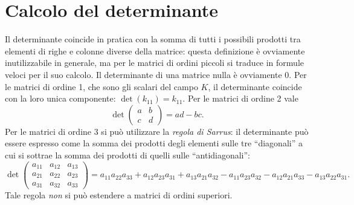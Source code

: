 \section{Calcolo del determinante}
Il determinante coincide in pratica con la somma di tutti i possibili prodotti tra elementi di righe e colonne diverse della matrice: questa definizione è ovviamente inutilizzabile in generale, ma per le matrici di ordini piccoli si traduce in formule veloci per il suo calcolo.
Il determinante di una matrice nulla è ovviamente 0.
Per le matrici di ordine 1, che sono gli scalari del campo $K$, il determinante coincide con la loro unica componente: $\det(k_{11})=k_{11}$.
Per le matrici di ordine 2 vale
\begin{equation*}
	\det
	\begin{pmatrix}
		a&b\\c&d
	\end{pmatrix}
	=ad-bc.
\end{equation*}
Per le matrici di ordine 3 si può utilizzare la \emph{regola di Sarrus}: il determinante può essere espresso come la somma dei prodotti degli elementi sulle tre ``diagonali'' a cui si sottrae la somma dei prodotti di quelli sulle ``antidiagonali'':
\begin{equation*}
	\det
	\begin{pmatrix}
		a_{11}&a_{12}&a_{13}\\
		a_{21}&a_{22}&a_{23}\\
		a_{31}&a_{32}&a_{33}
	\end{pmatrix}
	=a_{11}a_{22}a_{33}+a_{12}a_{23}a_{31}+a_{13}a_{21}a_{32}-a_{11}a_{23}a_{32}-a_{12}a_{21}a_{33}-a_{13}a_{22}a_{31}.
\end{equation*}
Tale regola \emph{non} si può estendere a matrici di ordini superiori.

